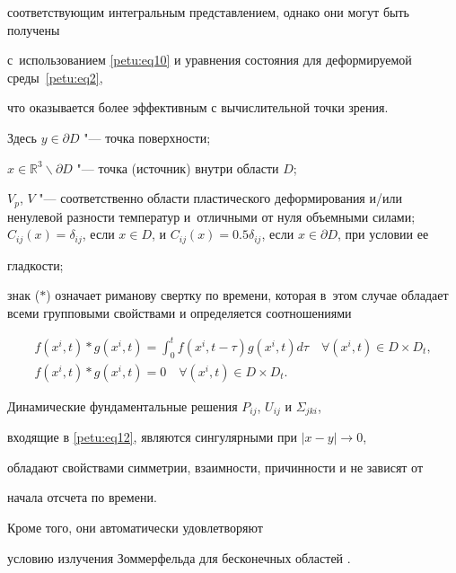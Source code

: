 соответствующим интегральным представлением, однако они могут быть получены

с~использованием \eqref{petu:eq10} и уравнения состояния для деформируемой среды~\eqref{petu:eq2},

что оказывается более эффективным с вычислительной точки зрения.

Здесь $y\in \partial D$ "--- точка поверхности; 

$x\in \mathbb R^3\backslash \partial D$ "--- точка (источник) внутри области $D$; 

$V_p$, $V$ "--- соответственно области пластического деформирования и/или ненулевой разности температур и~отличными от нуля объемными силами; $C_{ij} (x)=\delta _{ij}$, если $x\in

D$, и $C_{ij} (x)=0.5\delta _{ij}$, если $x\in \partial D$, при условии ее

гладкости; 

знак ($\ast $)  означает риманову свертку по времени, которая в~этом случае обладает всеми групповыми свойствами и определяется соотношениями

\begin{equation}

\label{petu:eq13}

\begin{array}{l}

\displaystyle

f(x^i,t)\ast g(x^i,t)=\int _0^t f(x^i,t-\tau ) g(x^i,t)d\tau \quad

\forall (x^i,t)\in D\times D_t, \\

f(x^i,t)\ast g(x^i,t)=0 \quad \forall (x^i,t)\in D\times D_t.

\end{array}

\end{equation}



Динамические фундаментальные решения $P_{ij}$, $U_{ij}$ и $\Sigma _{jki}$,

входящие в \eqref{petu:eq12}, являются сингулярными при $|x-y|\to 0$,

обладают свойствами симметрии, взаимности, причинности и не зависят от

начала отсчета по времени. 

Кроме того, они автоматически удовлетворяют

условию излучения Зоммерфельда для бесконечных областей \cite{petu:bib5}. 

